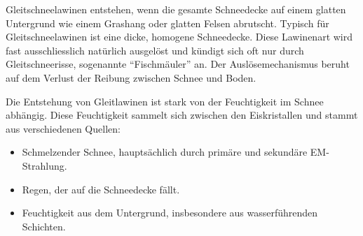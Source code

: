


Gleitschneelawinen entstehen, wenn die gesamte Schneedecke auf einem glatten Untergrund wie einem Grashang oder glatten Felsen abrutscht. Typisch für Gleitschneelawinen ist eine dicke, homogene Schneedecke. Diese Lawinenart wird fast ausschliesslich natürlich ausgelöst und kündigt sich oft nur durch Gleitschneerisse, sogenannte “Fischmäuler” an. Der Auslösemechanismus beruht auf dem Verlust der Reibung zwischen Schnee und Boden. \cite{Mitterer.202}

Die Entstehung von Gleitlawinen ist stark von der Feuchtigkeit im Schnee abhängig. Diese Feuchtigkeit sammelt sich zwischen den Eiskristallen und stammt aus verschiedenen Quellen:

\begin{itemize}
    \item Schmelzender Schnee, hauptsächlich durch primäre und sekundäre EM-Strahlung.
    \item Regen, der auf die Schneedecke fällt.
    \item Feuchtigkeit aus dem Untergrund, insbesondere aus wasserführenden Schichten.

\end{itemize}
